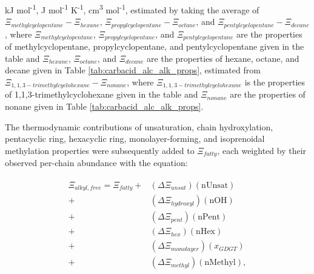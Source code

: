 {\begin{table}
\begin{threeparttable}
\begin{tablenotes}
     kJ mol\textsuperscript{-1},
     J mol\textsuperscript{-1} K\textsuperscript{-1},
     cm\textsuperscript{3} mol\textsuperscript{-1},
     estimated by taking the average of $\Xi_{methylcyclopentane} - \Xi_{hexane}$, $\Xi_{propylcyclopentane} - \Xi_{octane}$, and $\Xi_{pentylcyclopentane} - \Xi_{decane}$, where $\Xi_{methylcyclopentane}$, $\Xi_{propylcyclopentane}$, and $\Xi_{pentylcyclopentane}$ are the properties of methylcyclopentane, propylcyclopentane, and pentylcyclopentane given in the table and $\Xi_{hexane}$, $\Xi_{octane}$, and $\Xi_{decane}$ are the properties of hexane, octane, and decane given in Table \ref{tab:carbacid_alc_alk_props},
     estimated from $\Xi_{1,1,3-trimethylcyclohexane} - \Xi_{nonane}$, where $\Xi_{1,1,3-trimethylcyclohexane}$ is the properties of 1,1,3-trimethylcyclohexane given in the table and $\Xi_{nonane}$ are the properties of nonane given in Table \ref{tab:carbacid_alc_alk_props}.
    
        
  \end{tablenotes}
  
  \label{tab:ring}
  \end{threeparttable}
\end{table}
\setcounter{tabcounter}{0} %
\doublespace
\clearpage
}

The thermodynamic contributions of unsaturation, chain hydroxylation, pentacyclic ring, hexacyclic ring, monolayer-forming, and isoprenoidal methylation properties were subsequently added to $\Xi_{fatty}$, each weighted by their observed per-chain abundance with the equation:

\begin{align}
\begin{split}
\Xi_{alkyl, free} = \Xi_{fatty}
            + & (\Delta\Xi_{unsat})(\text{nUnsat}) \\
            + & (\Delta\Xi_{hydroxyl})(\text{nOH}) \\
            + & (\Delta\Xi_{pent})(\text{nPent}) \\
            + & (\Delta\Xi_{hex})(\text{nHex}) \\
            + & (\Delta\Xi_{monolayer})(x_{GDGT}) \\
            + & (\Delta\Xi_{methyl})(\text{nMethyl}), \\
\end{split}
\end{align}

